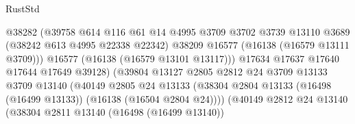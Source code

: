 \begin{lexlean}{RustStd}
\begin{coremodule}
                                            @38282
                                            (@39758
                                              @614
                                              @116
                                              @61
                                              @14
                                              @4995
                                              @3709
                                              @3702
                                              @3739
                                              @13110
                                              @3689
                                              (@38242 @613 @4995 @22338 @22342)
                                              @38209
                                              @16577
                                              (@16138 (@16579 @13111 @3709)))
                                            @16577
                                            (@16138 (@16579 @13101 @13117)))
                                          @17634
                                          @17637
                                          @17640
                                          @17644
                                          @17649
                                          @39128)
                                        (@39804
                                          @13127
                                          @2805
                                          @2812
                                          @24
                                          @3709
                                          @13133
                                          @3709
                                          @13140
                                          (@40149
                                            @2805
                                            @24
                                            @13133
                                            (@38304
                                              @2804
                                              @13133
                                              (@16498 (@16499 @13133))
                                              (@16138 (@16504 @2804 @24))))
                                          (@40149
                                            @2812
                                            @24
                                            @13140
                                            (@38304
                                              @2811
                                              @13140
                                              (@16498 (@16499 @13140))

\end{coremodule}
\end{lexlean}
